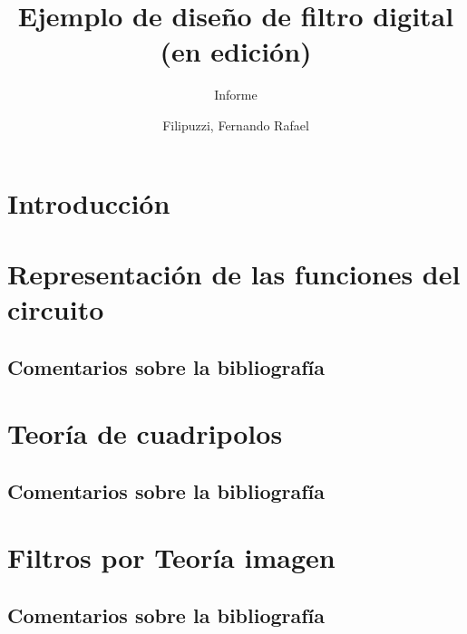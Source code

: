 \documentclass[oneside,a4paper,10pt]{scrbook}
\begin{document}
	\pagestyle{fancy}
	
	\fancyhead{}\fancyfoot{}

	
	\fancyfoot[RO,RO]{\thepage}
	\rfoot{ \thepage \hspace{1pt} - \pageref{LastPage}}
	
	\title{Ejemplo de diseño de filtro digital (en edición)}
	\subtitle{Informe}
	\author{Filipuzzi, Fernando Rafael	}
	
	
	\maketitle
	
	\tableofcontents
	
	\listoffigures\newpage
   
   
	\chapter{Introducción}
	{
		
	}
	
	\clearpage	
	
	\chapter{Representación de las funciones del circuito}
	{
		\section{Comentarios sobre la bibliografía}
   		{
    						
		}
	}	
	
    \clearpage	
	
	\chapter{Teoría de cuadripolos}
	{
		\section{Comentarios sobre la bibliografía}
   		{
    						
		}
	}	
	
	\clearpage
	
		
	\chapter{Filtros por Teoría imagen}
	{
		\section{Comentarios sobre la bibliografía}
   		{
    						
		}
	}	
	
\end{document}

